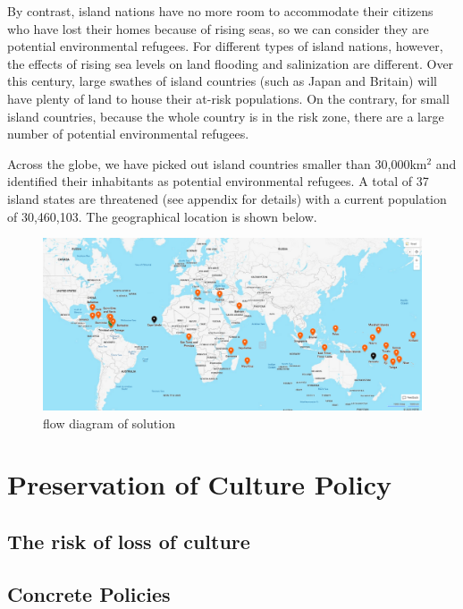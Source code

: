 \documentclass[12pt]{article}  %
\begin{document}
By contrast, island nations have no more room to accommodate their citizens who have lost their homes because of rising seas, so we can consider they are potential environmental refugees.
 For different types of island nations, however, the effects of rising sea levels on land flooding and salinization are different. Over this century, large swathes of island countries (such as Japan and Britain) will have plenty of land to house their at-risk populations. On the contrary, for small island countries, because the whole country is in the risk zone, there are a large number of potential environmental refugees.
 
Across the globe, we have picked out island countries smaller than 30,000km$^2$ and identified their inhabitants as potential environmental refugees. 
A total of 37 island states are threatened (see appendix for details) with a current population of 30,460,103. The geographical location is shown below.


\begin{figure}[htbp]\label{5.2}
	\centering
	\includegraphics[width=1\textwidth]{5.2.png}
	\caption{ flow diagram of solution}\label{5.2}
\end{figure}




\section{Preservation of Culture Policy}

\subsection{The risk of loss of culture}


\subsection{Concrete Policies}
\end{document}
